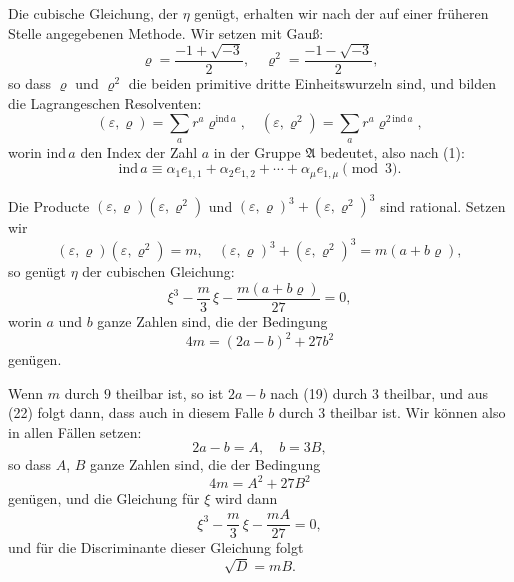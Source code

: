 \documentclass[12pt,a4paper]{article}
\begin{document}
Die cubische Gleichung, der $\eta$ gen\"ugt, erhalten wir nach der auf
einer fr\"uheren Stelle angegebenen Methode. Wir setzen mit
Gau\ss:
\[\varrho = \frac{-1 + \sqrt{-3}}{2},\quad \varrho^2 = \frac{-1 - \sqrt{-3}}{2},\]
so dass $\varrho$ und $\varrho^2$ die beiden primitive dritte Einheitswurzeln sind,
und bilden die Lagrangeschen Resolventen:
\begin{equation}\label{eq:k23-9}
(\varepsilon, \varrho) = \sum_a r^a \varrho^{\text{ind}\, a},\quad
(\varepsilon, \varrho^2) = \sum_a r^a \varrho^{2\,\text{ind}\, a},
\end{equation}
worin $\text{ind}\,a$ den Index der Zahl $a$ in der Gruppe $\mathfrak{A}$ bedeutet,
also nach (1):
\[\text{ind}\,a \equiv \alpha_1 e_{1,1} + \alpha_2 e_{1,2} + \cdots + \alpha_\mu e_{1,\mu} \pmod{3}.\]

Die Producte $(\varepsilon, \varrho)(\varepsilon, \varrho^2)$ und $(\varepsilon, \varrho)^3 + (\varepsilon, \varrho^2)^3$
sind rational. Setzen wir
\begin{equation}\label{eq:k23-10}
(\varepsilon, \varrho)(\varepsilon, \varrho^2) = m,\quad
(\varepsilon, \varrho)^3 + (\varepsilon, \varrho^2)^3 = m(a + b\varrho),
\end{equation}
so gen\"ugt $\eta$ der cubischen Gleichung:
\begin{equation}\label{eq:k23-11}
\xi^3 - \frac{m}{3}\,\xi - \frac{m(a + b\varrho)}{27} = 0,
\end{equation}
worin $a$ und $b$ ganze Zahlen sind, die der Bedingung
\begin{equation}\label{eq:k23-12}
4m = (2a - b)^2 + 27b^2
\end{equation}
gen\"ugen.

Wenn $m$ durch $9$ theilbar ist, so ist $2a - b$ nach (19) durch
$3$ theilbar, und aus (22) folgt dann, dass auch in diesem Falle
$b$ durch $3$ theilbar ist. Wir k\"onnen also in allen F\"allen setzen:
\[2a - b = A,\quad b = 3B,\]
so dass $A$, $B$ ganze Zahlen sind, die der Bedingung
\begin{equation}\label{eq:k23-13}
4m = A^2 + 27B^2
\end{equation}
gen\"ugen, und die Gleichung f\"ur $\xi$ wird dann
\begin{equation}\label{eq:k23-14}
\xi^3 - \frac{m}{3}\,\xi - \frac{mA}{27} = 0,
\end{equation}
und f\"ur die Discriminante dieser Gleichung folgt
\begin{equation}\label{eq:k23-15}
\sqrt{D} = mB.
\end{equation}
\end{document}
